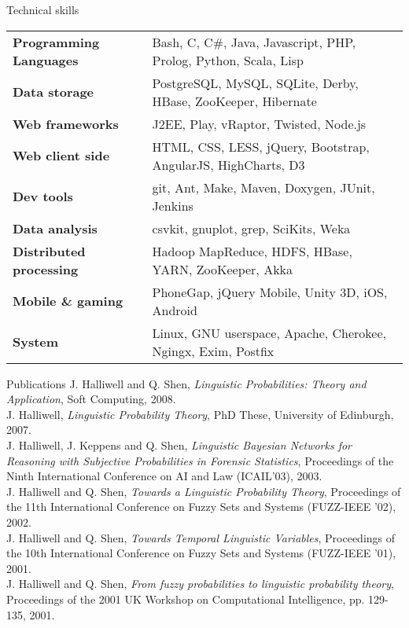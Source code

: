 \documentclass{resume} %
\begin{document}

\begin{rSection}{Technical skills}

\begin{tabular}{ @{} >{\bfseries}l @{\hspace{6ex}} l }
Programming Languages & Bash, C, C\#, Java, Javascript, PHP, Prolog, Python, Scala, Lisp \\
Data storage & PostgreSQL, MySQL, SQLite, Derby, HBase, ZooKeeper, Hibernate \\
Web frameworks & J2EE, Play, vRaptor, Twisted, Node.js \\
Web client side & HTML, CSS, LESS, jQuery, Bootstrap, AngularJS, HighCharts, D3 \\
Dev tools & git, Ant, Make, Maven, Doxygen, JUnit, Jenkins \\
Data analysis & csvkit, gnuplot, grep, SciKits, Weka \\
Distributed processing & Hadoop MapReduce, HDFS, HBase, YARN, ZooKeeper, Akka \\
Mobile \& gaming & PhoneGap, jQuery Mobile, Unity 3D, iOS, Android \\
System & Linux, GNU userspace, Apache, Cherokee, Ngingx, Exim, Postfix
\end{tabular}

\end{rSection}


\begin{rSection}{Publications}
J. Halliwell and Q. Shen, {\em Linguistic Probabilities: Theory and Application}, Soft Computing, 2008.\\
J. Halliwell, {\em Linguistic Probability Theory}, PhD These, University of Edinburgh, 2007.\\
J. Halliwell, J. Keppens and Q. Shen, {\em Linguistic Bayesian Networks for Reasoning with
Subjective Probabilities in Forensic Statistics}, Proceedings of the Ninth International
Conference on AI and Law (ICAIL'03), 2003.\\
J. Halliwell and Q. Shen, {\em Towards a Linguistic Probability Theory}, Proceedings of the
11th International Conference on Fuzzy Sets and Systems (FUZZ-IEEE '02), 2002.\\
J. Halliwell and Q. Shen, {\em Towards Temporal Linguistic Variables}, Proceedings of the
10th International Conference on Fuzzy Sets and Systems (FUZZ-IEEE '01), 2001.\\
J. Halliwell and Q. Shen, {\em From fuzzy probabilities to linguistic probability theory},
Proceedings of the 2001 UK Workshop on Computational Intelligence, pp. 129-135,
2001.\\
\end{rSection}
\end{document}
